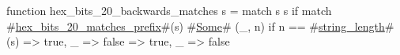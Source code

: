 function hex_bits_20_backwards_matches s = match s {
  s if match #\hyperref[sailRISCVzhexzybitszy20zymatcheszyprefix]{hex\_bits\_20\_matches\_prefix}#(s) {
    #\hyperref[sailRISCVzSome]{Some}# (_, n) if n == #\hyperref[sailRISCVzstringzylength]{string\_length}#(s) => true,
    _ => false
  } => true,
  _ => false
}
